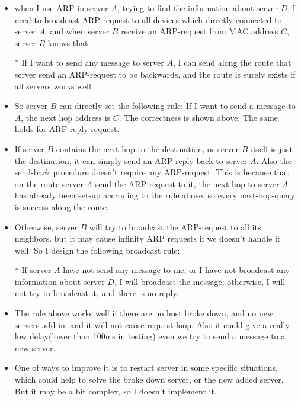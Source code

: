 \documentclass[11pt]{article}
\begin{document}
		\begin{itemize}
			\item when I use ARP in server $A$, trying to find the information about server $D$, I need to broadcast ARP-request to all devices which directly connected to server $A$. and when server $B$ receive an ARP-request from MAC address $C$, server $B$ knows that: 
			
			* If I want to send any message to server $A$, I can send along the route that server send an ARP-request to be backwards, and the route is surely exists if all servers works well.
				
			\item So server $B$ can directly set the following rule: If I want to send a message to $A$, the next hop address is $C$. The correctness is shown above. The same holds for ARP-reply request.
			
			\item If server $B$ contains the next hop to the destination, or server $B$ itself is just the destination, it can simply send an ARP-reply back to server $A$. Also the send-back procedure doesn't require any ARP-request. This is because that on the route server $A$ send the ARP-request to it, the next hop to server $A$ has already been set-up accroding to the rule above, so every next-hop-query is success along the route.
			
			\item Otherwise, server $B$ will try to broadcast the ARP-request to all its neighbors. but it may cause infinity ARP requests if we doesn't handle it well. So I design the following broadcast rule:
			
			* If server $A$ have not send any message to me, or I have not broadcast any information about server $D$, I will broadcast the message; otherwise, I will not try to broadcast it, and there is no reply.
			
			\item The rule above works well if there are no host broke down, and no new servers add in. and it will not cause request loop. Also it could give a really low delay(lower than 100ms in testing) even we try to send a message to a new server.
			
			\item One of ways to improve it is to restart server in some specific situations, which could help to solve the broke down server, or the new added server. But it may be a bit complex, so I doesn't implement it. 
		\end{itemize}
		
\end{document}
